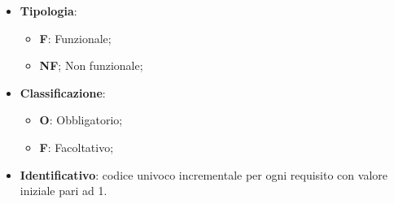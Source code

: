 \begin{itemize}
	\item \textbf{Tipologia}:
	\begin{itemize}
		\item \textbf{F}: Funzionale;
		\item \textbf{NF}; Non funzionale;
	\end{itemize}
	\item \textbf{Classificazione}:
	\begin{itemize}
		\item \textbf{O}: Obbligatorio;
		\item \textbf{F}: Facoltativo;
	\end{itemize}
	\item \textbf{Identificativo}: codice univoco incrementale per ogni requisito con valore iniziale pari ad 1.
\end{itemize}




